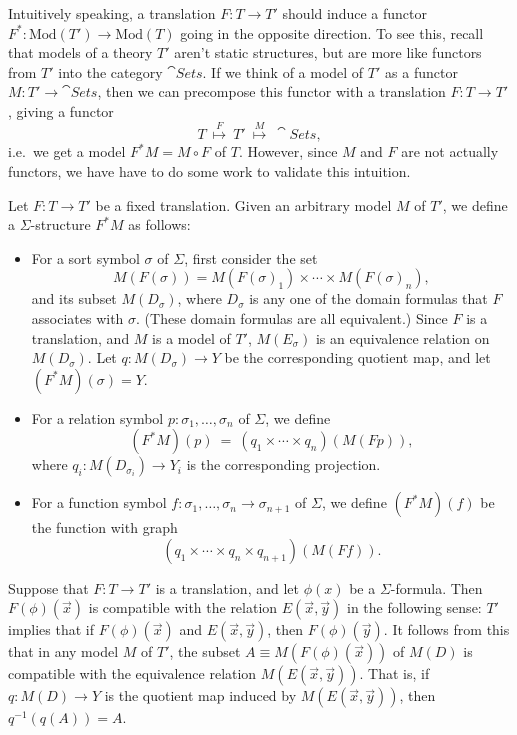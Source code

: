 Intuitively speaking, a translation $F:T\to T'$ should induce a
functor $F^*:\mathrm{Mod}(T')\to \mathrm{Mod}(T)$ going in the
opposite direction.  To see this, recall that models of a theory $T'$
aren't static structures, but are more like functors from $T'$ into
the category $\cat{Sets}$.  If we think of a model of $T'$ as a
functor $M:T'\to \cat{Sets}$, then we can precompose this functor with
a translation $F:T\to T'$, giving a functor
\[ T\:\stackrel{F}{\longmapsto} \:T' \:\stackrel{M}{\longmapsto}
  \:\cat{Sets} ,\] i.e.\ we get a model $F^*M=M\circ F$ of $T$.
However, since $M$ and $F$ are not actually functors, we have have to
do some work to validate this intuition.

\begin{defn} Let $F:T\to T'$ be a fixed translation.  Given an
  arbitrary model $M$ of $T'$, we define a $\Sigma$-structure $F^*M$
  as follows:
\begin{itemize}
\item For a sort symbol $\sigma$ of $\Sigma$, first consider the set
  \[ M(F(\sigma )) = M(F(\sigma )_1)\times\cdots\times M(F(\sigma )_n)
    ,\] and its subset $M(D_\sigma )$, where $D_\sigma$ is any one of
  the domain formulas that $F$ associates with $\sigma$.  (These
  domain formulas are all equivalent.)  Since $F$ is a translation,
  and $M$ is a model of $T'$, $M(E_\sigma )$ is an equivalence
  relation on $M(D_\sigma )$.  Let $q:M(D_\sigma )\to Y$ be the
  corresponding quotient map, and let $(F^*M)(\sigma )=Y$.
\item For a relation symbol $p:\sigma _1,\dots, \sigma _n$ of
  $\Sigma$, we define
  \[ (F^*M)(p) \:=\: (q_1\times\cdots\times q_n)(M(Fp)) ,\] where
  $q_i:M(D_{\sigma _i})\to Y_i$ is the corresponding projection.
\item For a function symbol $f:\sigma _1,\dots ,\sigma _n\to \sigma _{n+1}$
  of $\Sigma$, we define $(F^*M)(f)$ be the function with graph
  \[ (q_1\times\cdots\times q_n\times
    q_{n+1})(M(Ff)) .\]
\end{itemize} \end{defn}



\begin{note} \label{compat} Suppose that $F:T\to T'$ is a translation,
  and let $\phi (x)$ be a $\Sigma$-formula.  Then $F(\phi )(\vec{x})$
  is compatible with the relation $E(\vec{x},\vec{y})$ in the
  following sense: $T'$ implies that if $F(\phi )(\vec{x})$ and
  $E(\vec{x},\vec{y})$, then $F(\phi )(\vec{y})$.  It follows from
  this that in any model $M$ of $T'$, the subset
  $A\equiv M(F(\phi )(\vec{x}))$ of $M(D)$ is compatible with the
  equivalence relation $M(E(\vec{x},\vec{y}))$.  That is, if
  $q:M(D)\to Y$ is the quotient map induced by
  $M(E(\vec{x},\vec{y}))$, then $q^{-1}(q(A))=A$.  \end{note}

